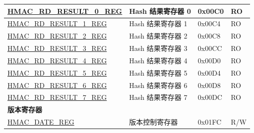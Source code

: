 \begin{longtable}{ | p{6cm} | p{7.2cm} | p{1.3cm} | p{1cm} | }
\hyperref[regdesc:HMACRDRESULTNREG]{HMAC\_RD\_RESULT\_0\_REG} & Hash 结果寄存器 0 & 0x00C0 & RO \\ \hline
\hyperref[regdesc:HMACRDRESULTNREG]{HMAC\_RD\_RESULT\_1\_REG} & Hash 结果寄存器 1 & 0x00C4 & RO \\ \hline
\hyperref[regdesc:HMACRDRESULTNREG]{HMAC\_RD\_RESULT\_2\_REG} & Hash 结果寄存器 2 & 0x00C8 & RO \\ \hline
\hyperref[regdesc:HMACRDRESULTNREG]{HMAC\_RD\_RESULT\_3\_REG} & Hash 结果寄存器 3 & 0x00CC & RO \\ \hline
\hyperref[regdesc:HMACRDRESULTNREG]{HMAC\_RD\_RESULT\_4\_REG} & Hash 结果寄存器 4 & 0x00D0 & RO \\ \hline
\hyperref[regdesc:HMACRDRESULTNREG]{HMAC\_RD\_RESULT\_5\_REG} & Hash 结果寄存器 5 & 0x00D4 & RO \\ \hline
\hyperref[regdesc:HMACRDRESULTNREG]{HMAC\_RD\_RESULT\_6\_REG} & Hash 结果寄存器 6 & 0x00D8 & RO \\ \hline
\hyperref[regdesc:HMACRDRESULTNREG]{HMAC\_RD\_RESULT\_7\_REG} & Hash 结果寄存器 7 & 0x00DC & RO \\ \hline
\multicolumn{4}{|l|}{\textbf{版本寄存器}} \\ \hline
\hyperref[regdesc:HMACDATEREG]{HMAC\_DATE\_REG} & 版本控制寄存器 & 0x01FC & R/W \\ \hline
\end{longtable}
